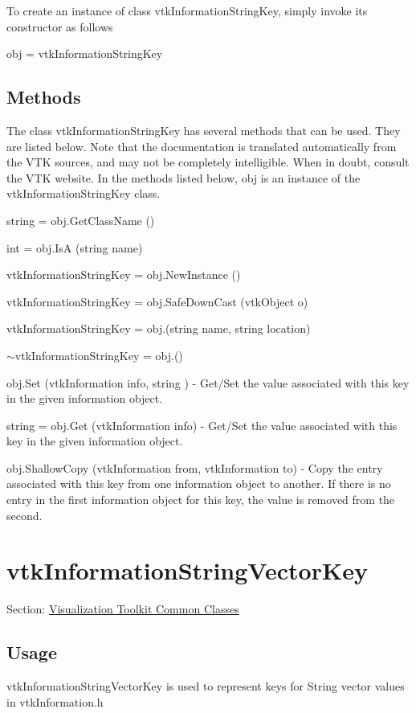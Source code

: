 To create an instance of class vtk\-Information\-String\-Key, simply invoke its constructor as follows \begin{DoxyVerb}  obj = vtkInformationStringKey
\end{DoxyVerb}
 \hypertarget{vtkwidgets_vtkxyplotwidget_Methods}{}\subsection{Methods}\label{vtkwidgets_vtkxyplotwidget_Methods}
The class vtk\-Information\-String\-Key has several methods that can be used. They are listed below. Note that the documentation is translated automatically from the V\-T\-K sources, and may not be completely intelligible. When in doubt, consult the V\-T\-K website. In the methods listed below, {\ttfamily obj} is an instance of the vtk\-Information\-String\-Key class. 
\begin{DoxyItemize}
\item {\ttfamily string = obj.\-Get\-Class\-Name ()}  
\item {\ttfamily int = obj.\-Is\-A (string name)}  
\item {\ttfamily vtk\-Information\-String\-Key = obj.\-New\-Instance ()}  
\item {\ttfamily vtk\-Information\-String\-Key = obj.\-Safe\-Down\-Cast (vtk\-Object o)}  
\item {\ttfamily vtk\-Information\-String\-Key = obj.(string name, string location)}  
\item {\ttfamily $\sim$vtk\-Information\-String\-Key = obj.()}  
\item {\ttfamily obj.\-Set (vtk\-Information info, string )} -\/ Get/\-Set the value associated with this key in the given information object.  
\item {\ttfamily string = obj.\-Get (vtk\-Information info)} -\/ Get/\-Set the value associated with this key in the given information object.  
\item {\ttfamily obj.\-Shallow\-Copy (vtk\-Information from, vtk\-Information to)} -\/ Copy the entry associated with this key from one information object to another. If there is no entry in the first information object for this key, the value is removed from the second.  
\end{DoxyItemize}\hypertarget{vtkcommon_vtkinformationstringvectorkey}{}\section{vtk\-Information\-String\-Vector\-Key}\label{vtkcommon_vtkinformationstringvectorkey}
Section\-: \hyperlink{sec_vtkcommon}{Visualization Toolkit Common Classes} \hypertarget{vtkwidgets_vtkxyplotwidget_Usage}{}\subsection{Usage}\label{vtkwidgets_vtkxyplotwidget_Usage}
vtk\-Information\-String\-Vector\-Key is used to represent keys for String vector values in vtk\-Information.\-h

